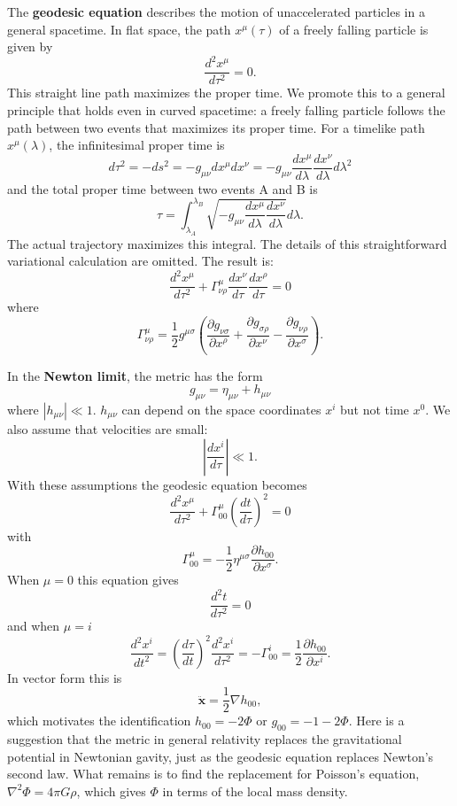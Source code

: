 \documentclass[11pt]{article}
\begin{document}
The \textbf{geodesic equation} describes the motion of unaccelerated particles in a general spacetime.
In flat space, the path $x^\mu(\tau)$ of a freely falling particle is given by
$$ \frac{d^2 x^\mu}{d\tau^2} = 0. $$
This straight line path maximizes the proper time.
We promote this to a general principle that holds even in curved spacetime: a freely falling particle follows the path between two events that maximizes its proper time.
For a timelike path $x^\mu(\lambda)$, the infinitesimal proper time is
$$ d\tau^2 = -ds^2 = -g_{\mu \nu} dx^\mu dx^\nu = -g_{\mu \nu} \frac{dx^\mu}{d\lambda} \frac{dx^\nu}{d\lambda} d\lambda^2 $$
and the total proper time between two events A and B is
$$ \tau = \int_{\lambda_A}^{\lambda_B} \sqrt{-g_{\mu \nu} \frac{dx^\mu}{d\lambda} \frac{dx^\nu}{d\lambda}} d\lambda. $$
The actual trajectory maximizes this integral.
The details of this straightforward variational calculation are omitted.
The result is:
$$ \frac{d^2 x^\mu}{d \tau^2} + \Gamma^\mu_{\nu \rho} \frac{dx^\nu}{d\tau} \frac{dx^\rho}{d\tau} = 0 $$
where
$$ \Gamma^\mu_{\nu \rho} = \frac{1}{2} g^{\mu \sigma} \left( \frac{\partial g_{\nu \sigma}}{\partial x^\rho} + \frac{\partial g_{\sigma \rho}}{\partial x^\nu} - \frac{\partial g_{\nu \rho}}{\partial x^\sigma} \right). $$

In the \textbf{Newton limit}, the metric has the form
$$ g_{\mu \nu} = \eta_{\mu \nu} + h_{\mu \nu} $$
where $|h_{\mu \nu}| \ll 1$.
$h_{\mu \nu}$ can depend on the space coordinates $x^i$ but not time $x^0$.
We also assume that velocities are small:
$$ \left| \frac{dx^i}{d\tau} \right| \ll 1. $$
With these assumptions the geodesic equation becomes
$$ \frac{d^2 x^\mu}{d \tau^2} + \Gamma^\mu_{00} \left( \frac{dt}{d\tau} \right)^2 = 0 $$
with
$$ \Gamma^\mu_{00} = -\frac{1}{2} \eta^{\mu \sigma} \frac{\partial h_{00}}{\partial x^\sigma}. $$ 
When $\mu = 0$ this equation gives 
$$ \frac{d^2 t}{d\tau^2} = 0 $$
and when $\mu = i$
$$ \frac{d^2 x^i}{dt^2} = \left( \frac{d\tau}{dt} \right)^2 \frac{d^2 x^i}{d\tau^2} =  -\Gamma^i_{00} = \frac{1}{2} \frac{\partial h_{00}}{\partial x^i}. $$
In vector form this is 
$$ \ddot{\boldsymbol{x}} = \frac{1}{2} \nabla h_{00}, $$
which motivates the identification $h_{00} = -2\Phi$ or $g_{00} = -1 - 2\Phi$.
Here is a suggestion that the metric in general relativity replaces the gravitational potential in Newtonian gavity, just as the geodesic equation replaces Newton's second law.
What remains is to find the replacement for Poisson's equation, $\nabla^2 \Phi = 4 \pi G \rho$, which gives $\Phi$ in terms of the local mass density.
\end{document}
